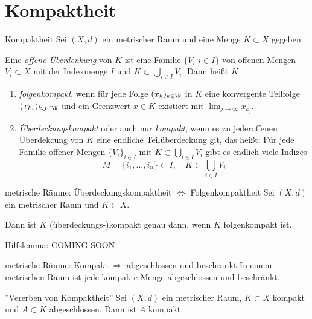 \newpage
\section{Kompaktheit}
\label{2.3}
\begin{definition}[deflabel=Kompaktheit]{Kompaktheit}
    Sei $(X,d)$ ein metrischer Raum und eine Menge $K\subset X$ gegeben.

    Eine \emph{offene Überdenkung} von $K$ ist eine Familie $\{V_i\_{i\in I}\}$ von offenen Mengen $V_i \subset X$ mit der Indexmenge $I$ und $K\subset \bigcup_{i \in I} V_i$. Dann heißt $K$
    \begin{enumerate}
        \item[(i)] \emph{folgenkompakt}, wenn für jede Folge $(x_k)_{k\in\N}$ in $K$ eine konvergente Teilfolge $(x_{k_j})_{k,j \in \N}$ und ein Grenzwert $x \in K$ existiert mit $\lim_{j \to \infty} x_{k_j}$.
        \item[(ii)] \emph{Überdeckungskompakt} oder auch nur \emph{kompakt}, wenn es zu jederoffenen Überdekcung von $K$ eine endliche Teilüberdeckung git, das heißt:
        Für jede Familie offener Mengen $\{V_i\}_{i\in I}$ mit $K \subset \bigcup_{i \in I} V_i$ gibt es endlich viele Indizes
        $$
            M = \{i_1,..., i_n\} \subset I, \quad K \subset \bigcup_{i \in I} V_i
        $$
    \end{enumerate}
\end{definition}

\begin{satz}{metrische Räume: Überdeckungskompaktheit $\Leftrightarrow$ Folgenkompaktheit}
    Sei $(X,d)$ ein metrischer Raum und $K\subset X$.

    \vspace{1em}

    Dann ist $K$ (überdeckungs-)kompakt genau dann, wenn $K$ folgenkompakt ist.
\end{satz}

\begin{lemma}{Hilfslemma:}
    COMING SOON
\end{lemma}

\begin{satz}{metrische Räume: Kompakt $\Rightarrow$ abgeschlossen und beschränkt}
    In einem metrischen Raum ist jede kompakte Menge abgeschlossen und beschränkt.
\end{satz}

\begin{satz}{''Vererben von Kompaktheit''}
    Sei $(X,d)$ ein metrischer Raum, $K\subset X$ kompakt und $A\subset K$ abgeschlossen. Dann ist $A$ kompakt.
\end{satz}


